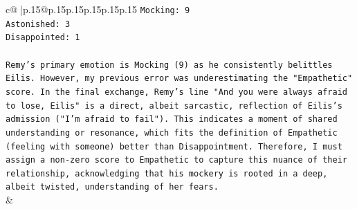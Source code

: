 \documentclass{article}
\begin{document}
{\begin{supertabular}{c@{$\;$}|p{.15\linewidth}@{}p{.15\linewidth}p{.15\linewidth}p{.15\linewidth}p{.15\linewidth}p{.15\linewidth}}
{{{\texttt{Mocking: 9} \\
\texttt{Astonished: 3} \\
\texttt{Disappointed: 1} \\
\\ 
\texttt{Remy's primary emotion is Mocking (9) as he consistently belittles Eilis. However, my previous error was underestimating the "Empathetic" score. In the final exchange, Remy's line "And you were always afraid to lose, Eilis" is a direct, albeit sarcastic, reflection of Eilis's admission ("I'm afraid to fail"). This indicates a moment of shared understanding or resonance, which fits the definition of Empathetic (feeling with someone) better than Disappointment. Therefore, I must assign a non{-}zero score to Empathetic to capture this nuance of their relationship, acknowledging that his mockery is rooted in a deep, albeit twisted, understanding of her fears.} \\
            }
        }
    }
    & \\ \\

\end{supertabular}
}
\end{document}
